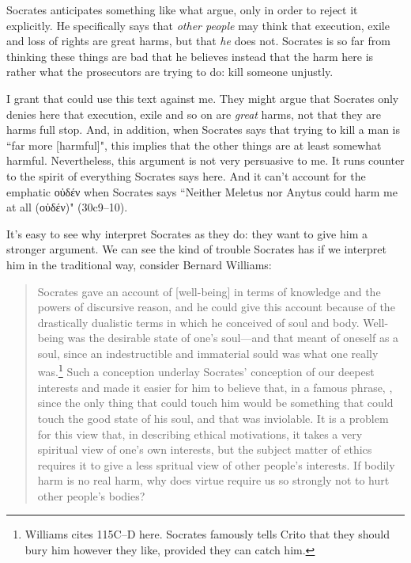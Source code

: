 \documentclass[11pt]{article}
\begin{document}
Socrates anticipates something like what \citeauthor{brickhouse2004} argue, only in order to reject it explicitly.  He specifically says that \emph{other people} may think that execution, exile and loss of rights are great harms, but that \emph{he} does not.  Socrates is so far from thinking these things are bad that he believes instead that the harm here is rather what the prosecutors are trying to do: kill someone unjustly.

I grant that \citeauthor{brickhouse2004} could use this text against me.  They might argue that Socrates only denies here that execution, exile and so on are \emph{great} harms, not that they are harms full stop.  And, in addition, when Socrates says that trying to kill a man is ``far more [harmful]", this implies that the other things are at least somewhat harmful.  Nevertheless, this argument is not very persuasive to me.  It runs counter to the spirit of everything Socrates says here. And it can't account for the emphatic {\g οὐδέν} when Socrates says ``Neither Meletus nor Anytus could harm me at all ({\g οὐδέν})" (30c9--10).

It's easy to see why \citeauthor{brickhouse2004} interpret Socrates as they do: they want to give him a stronger argument.  We can see the kind of trouble Socrates has if we interpret him in the traditional way, consider Bernard Williams:

\begin{quote}
    Socrates gave an account of [well-being] in terms of knowledge and the powers of discursive reason, and he could give this account because of the drastically dualistic terms in which he conceived of soul and body. Well-being was the desirable state of one's soul---and that meant of oneself as a soul, since an indestructible and immaterial sould was what one really was.\footnote{Williams cites  115C--D here.  Socrates famously tells Crito that they should bury him however they like, provided they can catch him.}  Such a conception underlay Socrates' conception of our deepest interests and made it easier for him to believe that, in a famous phrase, , since the only thing that could touch him would be something that could touch the good state of his soul, and that was inviolable.  It is a problem for this view that, in describing ethical motivations, it takes a very spiritual view of one's own interests, but the subject matter of ethics requires it to give a less spritual view of other people's interests. If bodily harm is no real harm, why does virtue require us so strongly not to hurt other people's bodies? \citep[34]{williams1985}
\end{quote}
\end{document}

